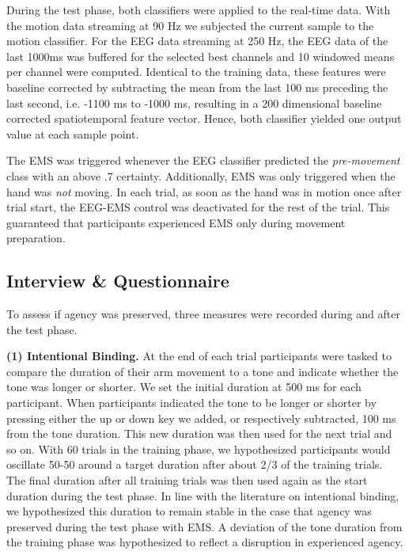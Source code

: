 During the test phase, both classifiers were applied to the real-time data. With the motion data streaming at 90 Hz we subjected the current sample to the motion classifier. For the EEG data streaming at 250 Hz, the EEG data of the last 1000ms was buffered for the selected best channels and 10 windowed means per channel were computed. Identical to the training data, these features were baseline corrected by subtracting the mean from the last 100 ms preceding the last second, i.e. -1100 ms to -1000 ms, resulting in a 200 dimensional baseline corrected spatiotemporal feature vector. Hence, both classifier yielded one output value at each sample point.

The EMS was triggered whenever the EEG classifier predicted the \textit{pre-movement} class with an above .7 certainty. Additionally, EMS was only triggered when the hand was \textit{not} moving. In each trial, as soon as the hand was in motion once after trial start, the EEG-EMS control was deactivated for the rest of the trial. This guaranteed that participants experienced EMS only during movement preparation.

\subsection{Interview \& Questionnaire}

To assess if agency was preserved, three measures were recorded during and after the test phase.

\indent\textbf{(1) Intentional Binding.}
At the end of each trial participants were tasked to compare the duration of their arm movement to a tone and indicate whether the tone was longer or shorter. We set the initial duration at 500 ms for each participant. When participants indicated the tone to be longer or shorter by pressing either the up or down key we added, or respectively subtracted, 100 ms from the tone duration. This new duration was then used for the next trial and so on. With 60 trials in the training phase, we hypothesized participants would oscillate 50-50 around a target duration after about 2/3 of the training trials. The final duration after all training trials was then used again as the start duration during the test phase. In line with the literature on intentional binding, we hypothesized this duration to remain stable in the case that agency was preserved during the test phase with EMS. A deviation of the tone duration from the training phase was hypothesized to reflect a disruption in experienced agency.

